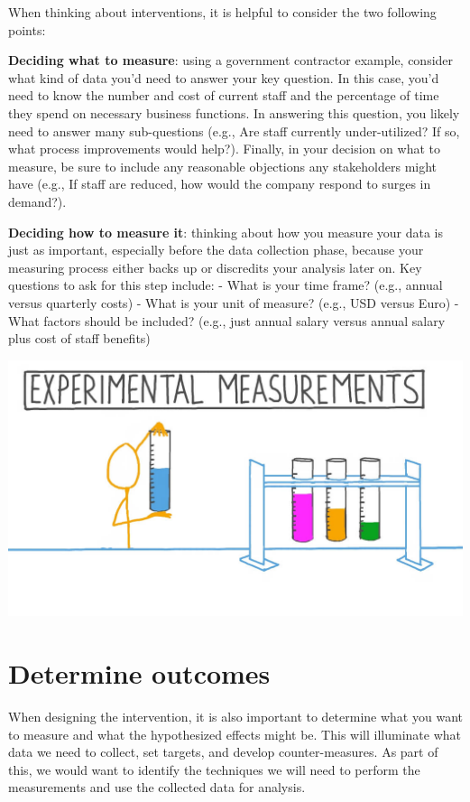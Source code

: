 \documentclass[openany]{book}
\begin{document}
When thinking about interventions, it is helpful to consider the two following points:

\textbf{Deciding what to measure}: using a government contractor example, consider what kind of data you'd need to answer your key question. In this case, you'd need to know the number and cost of current staff and the percentage of time they spend on necessary business functions. In answering this question, you likely need to answer many sub-questions (e.g., Are staff currently under-utilized? If so, what process improvements would help?). Finally, in your decision on what to measure, be sure to include any reasonable objections any stakeholders might have (e.g., If staff are reduced, how would the company respond to surges in demand?).

\textbf{Deciding how to measure it}: thinking about how you measure your data is just as important, especially before the data collection phase, because your measuring process either backs up or discredits your analysis later on. Key questions to ask for this step include:
- What is your time frame? (e.g., annual versus quarterly costs)
- What is your unit of measure? (e.g., USD versus Euro)
- What factors should be included? (e.g., just annual salary versus annual salary plus cost of staff benefits)

\includegraphics{fig/experimental_measurements.jpeg}

\hypertarget{determine-outcomes}{%
\section{Determine outcomes}\label{determine-outcomes}}

When designing the intervention, it is also important to determine what you want to measure and what the hypothesized effects might be. This will illuminate what data we need to collect, set targets, and develop counter-measures. As part of this, we would want to identify the techniques we will need to perform the measurements and use the collected data for analysis.
\end{document}
